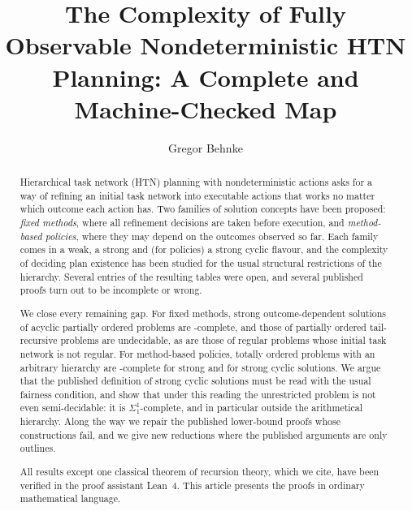 \documentclass[manuscript, screen]{jair}
\begin{document}
\title[The Complexity of FOND HTN Planning]{The Complexity of Fully Observable
  Nondeterministic HTN Planning: A Complete and Machine-Checked Map}

\author{Gregor Behnke}

\renewcommand{\shortauthors}{Behnke}

\begin{abstract}
  Hierarchical task network (HTN) planning with nondeterministic actions asks for a way of
  refining an initial task network into executable actions that works no matter which outcome
  each action has. Two families of solution concepts have been proposed: \emph{fixed methods},
  where all refinement decisions are taken before execution, and \emph{method-based policies},
  where they may depend on the outcomes observed so far. Each family comes in a weak, a strong
  and (for policies) a strong cyclic flavour, and the complexity of deciding plan existence has
  been studied for the usual structural restrictions of the hierarchy. Several entries of the
  resulting tables were open, and several published proofs turn out to be incomplete or wrong.

  We close every remaining gap. For fixed methods, strong outcome-dependent solutions of acyclic partially ordered problems
  are \EXPSPACE-complete, and those of partially ordered tail-recursive problems are
  undecidable, as are those of regular problems whose initial task network is not regular. For method-based
  policies, totally ordered problems with an arbitrary hierarchy are \TWOEXP-complete for strong
  and for strong cyclic solutions. We argue that the published definition of strong cyclic
  solutions must be read with the usual fairness condition, and show that under this reading
  the unrestricted problem is not even semi-decidable: it is $\Sigma^1_1$-complete, and in
  particular outside the arithmetical hierarchy. Along the way we repair the published
  lower-bound proofs whose constructions fail, and we give new reductions where the published
  arguments are only outlines.

  All results except one classical theorem of recursion theory, which we cite, have been
  verified in the proof assistant Lean~4. This article presents the proofs in ordinary
  mathematical language.
\end{abstract}

\received{}
\received[accepted]{}

\maketitle










\printbibliography
\end{document}
